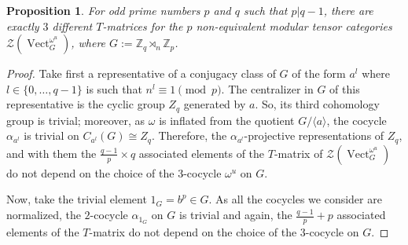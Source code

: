 \documentclass[12pt]{amsart}
\newtheorem{Prop}[Thm]{Proposition}
\theoremstyle{remark}
\theoremstyle{definition}
\numberwithin{equation}{section}
\newcommand\Vect{\operatorname{Vect}}
\newcommand\CTR{\mathcal Z}
\begin{document}
\begin{Prop}
For odd prime numbers $p$ and $q$ such that $p | q-1$, there are exactly $3$ different $T$-matrices for the $p$ non-equivalent modular tensor categories $\CTR(\Vect^{\omega^u}_G)$, where $G:=\mathbb{Z}_q \rtimes_n \mathbb{Z}_p$.
\end{Prop}
\begin{proof}
Take first a representative of a conjugacy class of $G$ of the form $a^l$ where $l \in \lbrace 0 , \dots , q-1 \rbrace$ is such that $n^l \equiv 1 \pmod p$. The centralizer in $G$ of this representative is the cyclic group $Z_q$ generated by $a$. So, its third cohomology group is trivial; moreover, as $\omega$ is inflated from the quotient $G/\langle a \rangle$, the cocycle $\alpha_{a^l}$ is trivial on $C_{a^l}(G) \cong Z_q$. Therefore, the $\alpha_{a^l}$-projective representations of $Z_q$, and with them the $\frac{q-1}{p} \times q$ associated elements of the $T$-matrix of $\CTR(\Vect^{\omega^u}_G)$ do not depend on the choice of the $3$-cocycle $\omega^u$ on $G$.

Now, take the trivial element $1_G = b^p \in G$. As all the cocycles we consider are normalized, the $2$-cocycle $\alpha_{1_G}$ on $G$ is trivial and again, the $\frac{q-1}{p}+p$ associated elements of the $T$-matrix do not depend on the choice of the $3$-cocycle on $G$.


\end{proof}
\end{document}
